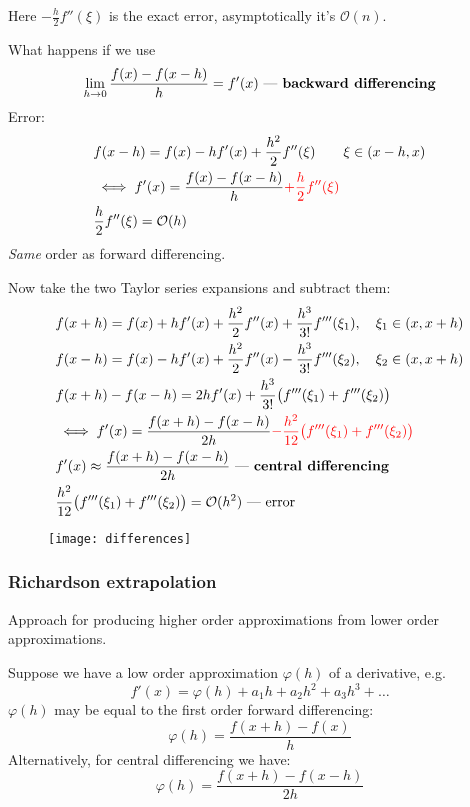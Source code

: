 Here $-\frac{h}{2} f''(\xi)$ is the exact error, asymptotically it's $\mathcal{O}(n)$.

What happens if we use
\[
    \lim_{h \to 0} \frac{f(x) - f(x-h)}{h} = f'(x) \text{ --- \textbf{backward differencing}}
\]
Error:
\begin{align*}
    &f(x - h) = f(x) - h f'(x) + \frac{h^2}{2} f''(\xi) \qquad \xi \in (x - h, x)
    \\&\iff
    f'(x) = \frac{f(x) - f(x - h)}{h} \textcolor{red}{+ \frac{h}{2} f''(\xi)}
    \\&
    \frac{h}{2} f''(\xi) = \mathcal{O}(h)
\end{align*}
\textit{Same} order as forward differencing.

Now take the two Taylor series expansions and subtract them:
\begin{align*}
    &
    f(x+h) = f(x) + hf'(x) + \frac{h^2}{2} f''(x) + \frac{h^3}{3!} f'''(\xi_1),\quad \xi_1 \in (x, x + h)
    \\&
    f(x-h) = f(x) - hf'(x) + \frac{h^2}{2} f''(x) - \frac{h^3}{3!} f'''(\xi_2),\quad \xi_2 \in (x, x + h)
    \\&
    f(x + h) - f(x - h) = 2h f'(x) + \frac{h^3}{3!} \bigl(f'''(\xi_1) + f'''(\xi_2)\bigr)
    \\&
    \iff f'(x) = \frac{f(x+h) - f(x-h)}{2h} \textcolor{red}{- \frac{h^2}{12} \bigl(f'''(\xi_1) + f'''(\xi_2)\bigr)}
    \\&
    f'(x) \approx \frac{f(x+h) - f(x-h)}{2h} \text{ --- \textbf{central differencing}}
    \\&
    \frac{h^2}{12} \bigl(f'''(\xi_1) + f'''(\xi_2)\bigr) = \mathcal{O}(h^2) \text{ --- error}
\end{align*}

\begin{figure*}[h]
    \centering
    \texttt{[image: differences]}
\end{figure*}

\subsubsection{Richardson extrapolation}
Approach for producing higher order approximations from lower order approximations.

Suppose we have a low order approximation $\varphi(h)$ of a derivative, e.g.
\[
    f'(x) = \varphi(h) + a_1 h + a_2 h^2 + a_3 h^3 + \dots
\]
$\varphi(h)$ may be equal to the first order forward differencing:
\[
    \varphi(h) = \frac{f(x+h) - f(x)}{h}
\]
Alternatively, for central differencing we have:
\[
    \varphi(h) = \frac{f(x+h) - f(x-h)}{2h}
\]

